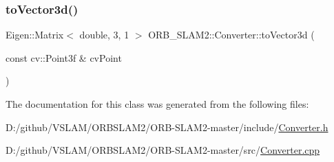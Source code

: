 \mbox{\label{class_o_r_b___s_l_a_m2_1_1_converter_af7b71b64b74fd45b39b9a7f47ee80145}} 
\subsubsection{\texorpdfstring{to\+Vector3d()}{toVector3d()}\hspace{0.1cm}{\footnotesize\ttfamily [2/2]}}
{\footnotesize\ttfamily Eigen\+::\+Matrix$<$ double, 3, 1 $>$ O\+R\+B\+\_\+\+S\+L\+A\+M2\+::\+Converter\+::to\+Vector3d (\begin{DoxyParamCaption}\item[{const cv\+::\+Point3f \&}]{cv\+Point }\end{DoxyParamCaption})\hspace{0.3cm}{\ttfamily [static]}}



The documentation for this class was generated from the following files\+:\begin{DoxyCompactItemize}
\item 
D\+:/github/\+V\+S\+L\+A\+M/\+O\+R\+B\+S\+L\+A\+M2/\+O\+R\+B-\/\+S\+L\+A\+M2-\/master/include/\mbox{\hyperlink{_converter_8h}{Converter.\+h}}\item 
D\+:/github/\+V\+S\+L\+A\+M/\+O\+R\+B\+S\+L\+A\+M2/\+O\+R\+B-\/\+S\+L\+A\+M2-\/master/src/\mbox{\hyperlink{_converter_8cpp}{Converter.\+cpp}}\end{DoxyCompactItemize}
